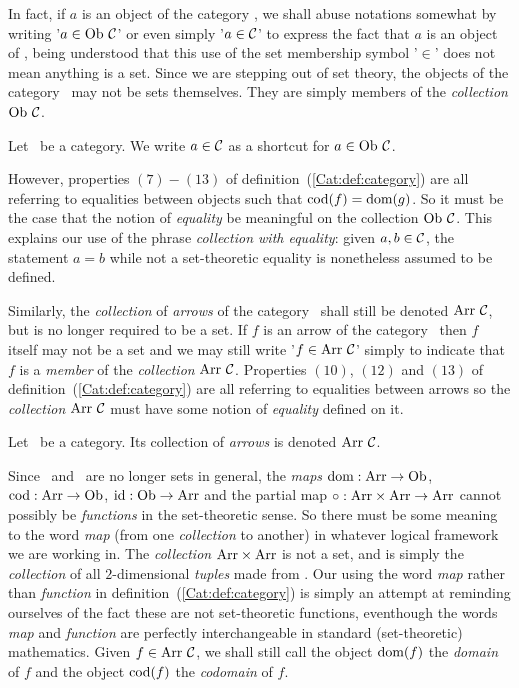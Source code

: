 In fact, if
$a$ is an object of the category \Cat, we shall abuse notations somewhat
by writing '$a\in\mbox{\rm Ob}\ \mbox{$\cal C$}$' or even simply '$a\in\mbox{$\cal C$}$' to express the fact 
that $a$ is an object of \Cat, being understood that this use of the
set membership symbol '$\in$' does not mean anything is a set. Since we 
are stepping out of set theory, the objects of the category \Cat\ may not
be sets themselves. They are simply members of the {\em collection} 
$\mbox{\rm Ob}\ \mbox{$\cal C$}$. 
\begin{notation}\label{Cat:notation:membership}
    Let \Cat\ be a category. We write $a\in\mbox{$\cal C$}$ as a shortcut for 
    $a\in\mbox{\rm Ob}\ \mbox{$\cal C$}$.
\end{notation}

However, properties $(7)-(13)$ of 
definition~(\ref{Cat:def:category}) are all referring to equalities
between objects such that $\mbox{\rm cod}(f)=\mbox{\rm dom}(g)$. So it must be the case that 
the notion of {\em equality} be meaningful on the collection $\mbox{\rm Ob}\ \mbox{$\cal C$}$. 
This explains our use of the phrase {\em collection with equality}: given
$a,b\in\mbox{$\cal C$}$, the statement $a=b$ while not a set-theoretic equality is 
nonetheless assumed to be defined. 

Similarly, the {\em collection} of
{\em arrows} of the category \Cat\ shall still be denoted $\arr\ \Cat$,
but is no longer required to be a set. If $f$ is an arrow of the category
\Cat\ then $f$ itself may not be a set and we may still write '$f\in\arr\ \Cat$'
simply to indicate that $f$ is a {\em member} of the {\em collection}
$\arr\ \Cat$. Properties $(10)$, $(12)$ and $(13)$ of 
definition~(\ref{Cat:def:category}) are all referring to equalities 
between arrows so the {\em collection} $\arr\ \Cat$ must have some notion
of {\em equality} defined on it. 

\begin{notation}\label{Cat:notation:arrows}
    Let \Cat\ be a category. Its collection of {\em arrows} is denoted $\arr\ 
    \Cat$.
\end{notation}

Since \ob\ and \arr\ are no longer sets in general, the {\em maps} 
$\mbox{\rm dom}:\mbox{\rm Arr}\to\mbox{\rm Ob}$, $\mbox{\rm cod}:\mbox{\rm Arr}\to\mbox{\rm Ob}$, $\mbox{\rm id}:\mbox{\rm Ob}\to\mbox{\rm Arr}$ and the partial map 
$\circ:\mbox{\rm Arr}\times\mbox{\rm Arr}\to\mbox{\rm Arr}$ cannot possibly be {\em functions} in the 
set-theoretic sense. So there must be some meaning to the word {\em map}
(from one {\em collection} to another) in whatever logical framework
we are working in. The {\em collection} $\mbox{\rm Arr}\times\mbox{\rm Arr}$ is not a set, 
and is simply the {\em collection} of all $2$-dimensional {\em tuples}
made from \arr. Our using the word {\em map} rather than {\em function}
in definition~(\ref{Cat:def:category}) is simply an attempt at reminding
ourselves of the fact these are not set-theoretic functions, eventhough
the words {\em map} and {\em function} are perfectly interchangeable in 
standard (set-theoretic) mathematics. Given $f\in\arr\ \Cat$, we shall 
still call the object $\mbox{\rm dom}(f)$ the {\em domain} of $f$ and the object 
$\mbox{\rm cod}(f)$ the {\em codomain} of $f$.


